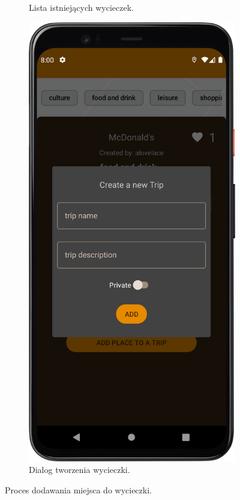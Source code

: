 \begin{figure}[H]
\begin{subfigure}[b]{0.3\textwidth}
                \caption{Lista istniejących wycieczek.\label{trip_exist}}
            \end{subfigure}
            \hfill
            \begin{subfigure}[b]{0.3\textwidth}
                \centering
                \includegraphics[width=\textwidth]{src/app/new_trip.png}
                \caption{Dialog tworzenia wycieczki.\label{trip_new}}
            \end{subfigure}
            \caption{Proces dodawania miejsca do wycieczki.\label{trip}}
            \qquad
        \end{figure} 
        \vspace{1cm}

